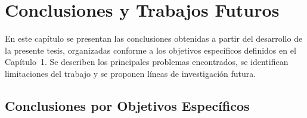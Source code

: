 \chapter{Conclusiones y Trabajos Futuros}\label{chap:conclusiones}

En este capítulo se presentan las conclusiones obtenidas a partir del desarrollo de la presente tesis, organizadas conforme a los objetivos específicos definidos en el Capítulo~1. Se describen los principales problemas encontrados, se identifican limitaciones del trabajo y se proponen líneas de investigación futura.

\section{Conclusiones por Objetivos Específicos}

